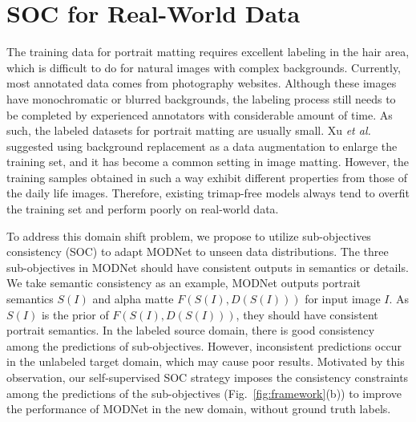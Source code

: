 \documentclass[letterpaper]{article} \usepackage{aaai22}  \usepackage{times}  \usepackage{helvet}  \usepackage{courier}  \usepackage[hyphens]{url}  \usepackage{graphicx} \urlstyle{rm} \def\UrlFont{\rm}  \usepackage{natbib}  \usepackage{caption} \usepackage{booktabs}
\begin{document}
\section{SOC for Real-World Data}\label{sec:soc}

The training data for portrait matting requires excellent labeling in the hair area, which is difficult to do for natural images with complex backgrounds. Currently, most annotated data comes from photography websites. Although these images have monochromatic or blurred backgrounds, the labeling process still needs to be completed by experienced annotators with considerable amount of time. As such, the labeled datasets for portrait matting are usually small. Xu {\it et al.} \cite{DIM} suggested using background replacement as a data augmentation to enlarge the training set, and it has become a common setting in image matting. However, the training samples obtained in such a way exhibit different properties from those of the daily life images. 
Therefore, existing trimap-free models always tend to overfit the training set and perform poorly on real-world data. 

To address this domain shift problem, we propose to utilize sub-objectives consistency (SOC) to adapt MODNet to unseen data distributions. The three sub-objectives in MODNet should have consistent outputs in semantics or details. We take semantic consistency as an example, MODNet outputs portrait semantics $S(I)$ and alpha matte $F(S(I), D(S(I)))$ for input image $I$. As $S(I)$ is the prior of $F(S(I), D(S(I)))$, they should have consistent portrait semantics. In the labeled source domain, there is good consistency among the predictions of sub-objectives. However, inconsistent predictions occur in the unlabeled target domain, which may cause poor results. Motivated by this observation, our self-supervised SOC strategy imposes the consistency constraints among the predictions of the sub-objectives (Fig.~\ref{fig:framework}(b)) to improve the performance of MODNet in the new domain, without ground truth labels. 
\end{document}
